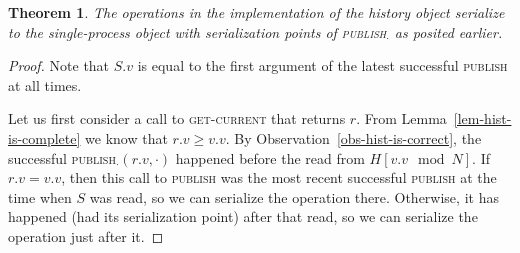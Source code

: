 \documentclass[a4paper,11pt]{article}
\newtheorem{theorem}{Theorem}
\newcommand{\fn}[1]{\textsc{#1}}
\begin{document}
\begin{theorem}
The operations in the implementation of the history object serialize to the single-process object with serialization points of \fn{publish$_\cdot$} as posited earlier.
\end{theorem}
\begin{proof}
Note that $S.v$ is equal to the first argument of the latest successful \fn{publish} at all times.

Let us first consider a call to \fn{get-current} that returns $r$. From Lemma~\ref{lem-hist-is-complete} we know that $r.v \geq v.v$.
By Observation~\ref{obs-hist-is-correct}, the successful \fn{publish$_\cdot$}$(r.v, \cdot)$ happened before the read from $H[v.v\mod N]$. If $r.v = v.v$, then this call to \fn{publish} was the most recent successful \fn{publish} at the time when $S$ was read, so we can serialize the operation there. Otherwise, it has happened (had its serialization point) after that read, so we can serialize the operation just after it.


\end{proof}
\end{document}
